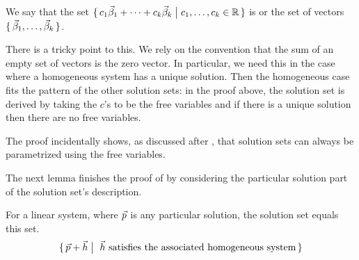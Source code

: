 We say that the set
$\mbox{$\{\,c_1\vec{\beta}_1+\cdots+c_k\vec{\beta}_k \bigm| c_1,\ldots,c_k\in\mathbb{R}\,\}$}$
is  or  the set of vectors
\( \mbox{$\{\,\smash{\vec{\beta}_1},\ldots,\smash{\vec{\beta}_k}\,\}$} \).

There is a tricky point to this.
We rely on the convention that the sum of an empty set of vectors is the 
zero vector.
In particular, we need this in the case where 
a homogeneous system has a unique solution.
Then the homogeneous case 
fits the pattern of the other solution sets: in the proof above,
the solution set is derived by taking the \( c \)'s to be the free variables
and if there is a unique solution then there are no free variables.

The proof incidentally shows, 
as discussed after , that solution sets can
always be parametrized using the free variables.

The next lemma finishes the proof of  
by considering the particular solution part of the 
solution set's description.

\begin{lemma}  \label{th:GenEqPartHomo}
For a linear system, where $\vec{p}\/$ is any particular solution,
the solution set equals this set.
\begin{equation*}
  \mbox{$\{\,\vec{p}+\vec{h} \bigm| \text{ \( \vec{h} \) satisfies the
                                associated homogeneous system}     \,\}$}
\end{equation*}
\end{lemma}

